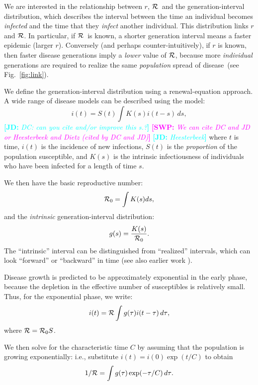 \documentclass[12pt]{article}
\newcommand{\RR}{\ensuremath{{\cal R}}}
\newcommand{\Rx}[1]{\ensuremath{{\cal R}_{#1}}}
\newcommand{\Ro}{\Rx{0}}
\newcommand{\Tc}{\ensuremath{C}}
\newcommand{\fref}[1]{Fig.~\ref{fig:#1}}
\newcommand{\comment}[3]{\textcolor{#1}{\textbf{[#2: }\textit{#3}\textbf{]}}}
\newcommand{\jd}[1]{\comment{cyan}{JD}{#1}}
\newcommand{\swp}[1]{\comment{magenta}{SWP}{#1}}
\begin{document}
We are interested in the relationship between $r$, \RR~and the generation-interval distribution, which describes the interval between the time an individual becomes \emph{infected} and the time that they \emph{infect} another individual.
This distribution links $r$ and \RR. In particular, if \RR~is known, a shorter generation interval means a faster epidemic (larger $r$). Conversely (and perhaps counter-intuitively), if $r$ is known, then faster disease generations imply a \emph{lower} value of \RR, because more \emph{individual} generations are required to realize the same \emph{population} spread of disease~(see \fref{link}).

We define the generation-interval distribution using a renewal-equation approach.
A wide range of disease models can be described using the model: 
\begin{equation}
i(t) = S(t)\int{K(s)i(t-s) \,ds},
\label{eq:Renewal}
\end{equation}
\jd{DC: can you cite and/or improve this s.?}
\swp{We can cite DC and JD or Heesterbeek and Dietz (cited by DC and JD)}
\jd{Heesterbeek}
where $t$ is time, $i(t)$ is the incidence of new infections, $S(t)$ is the \emph{proportion} of the population susceptible, and $K(s)$ is the intrinsic infectiousness of individuals who have been infected for a length of time $s$.

We then have the basic reproductive number: 
\begin{equation}
\Ro = \int{K(s)ds},
\end{equation}
and the \emph{intrinsic} generation-interval distribution:
\begin{equation}
g(s) = \frac{K(s)}{\Ro}.
\end{equation}
The ``intrinsic'' interval can be distinguished from ``realized'' intervals, which can look ``forward'' or ``backward'' in time \cite{ChamDush15} (see also earlier work \cite{Sven07,Nish10}).

Disease growth is predicted to be approximately exponential in the early phase, because the depletion in the effective number of susceptibles is relatively small.
Thus, for the exponential phase, we write:
\begin{equation}
i(t) = \RR\int{g(\tau)i(t-\tau) \,d\tau},
\end{equation}
where $\RR = \Ro S$.

We then solve for the characteristic time $\Tc$ by assuming that the population is growing exponentially: i.e., substitute $i(t) = i(0) \exp(t/\Tc)$ to obtain
\begin{equation}
	1/\RR = \int{g(\tau)\exp(-\tau/\Tc) \,d\tau}.\label{eq:Euler}
\end{equation}
\end{document}
